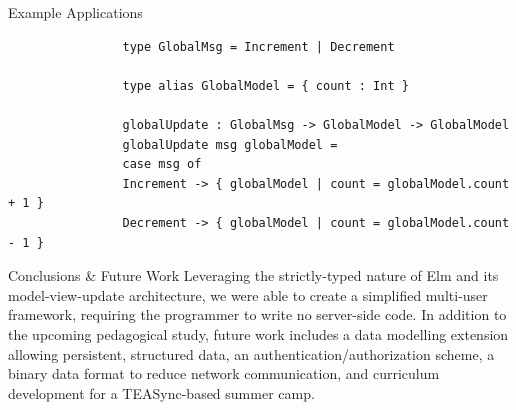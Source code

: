 \documentclass[22pt]{beamer}
\begin{document}
\begin{frame}[fragile]
\begin{textblock}{7.25}
\begin{block}{\fontsize{37}{20}\selectfont Example Applications}
            \begin{Verbatim}
                type GlobalMsg = Increment | Decrement

                type alias GlobalModel = { count : Int }

                globalUpdate : GlobalMsg -> GlobalModel -> GlobalModel
                globalUpdate msg globalModel =
                case msg of
                Increment -> { globalModel | count = globalModel.count + 1 }
                Decrement -> { globalModel | count = globalModel.count - 1 }
            \end{Verbatim}

            \vspace{-5mm}
        \end{block}

        \begin{block}{\fontsize{37}{20}\selectfont Conclusions \& Future Work}
            Leveraging the strictly-typed nature of Elm and its model-view-update architecture, we were able
            to create a simplified multi-user framework, requiring the programmer to write no server-side code. In addition to the upcoming pedagogical study, future work includes a data modelling extension allowing persistent, structured data, an
            authentication/authorization scheme, a binary data format to reduce network communication, and
            curriculum development for a TEASync-based summer camp.
        \end{block}



\end{textblock}
\end{frame}
\end{document}
